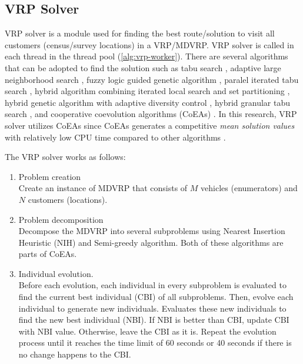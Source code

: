 \documentclass[conference]{IEEEtran}
\begin{document}
\subsection{VRP Solver}
\label{ssec:vrp-solver}
VRP solver is a module used for finding the best route/solution to visit all customers (census/survey locations) in a VRP/MDVRP. VRP solver is called in each thread in the thread pool (\autoref{alg:vrp-worker}). There are several algorithms that can be adopted to find the solution such as tabu search \cite{cordeau_tabu_1997}, adaptive large neighborhood search  \cite{pisinger_general_2007}, fuzzy logic guided genetic algorithm \cite{lau_application_2010}, paralel iterated tabu search \cite{cordeau_parallel_2012}, hybrid algorithm combining iterated local search and set partitioning \cite{subramanian_hybrid_2013}, hybrid genetic algorithm with adaptive diversity control \cite{vidal_implicit_2014}, hybrid granular tabu search \cite{escobar_hybrid_2014}, and cooperative coevolution algorithms (CoEAs) \cite{de_oliveira_cooperative_2016}. In this research, VRP solver utilizes CoEAs since CoEAs generates a competitive \textit{mean solution values} with relatively low CPU time compared to other algorithms \cite{de_oliveira_cooperative_2016}. 


The VRP solver works as follows:
\begin{enumerate}
	\item Problem creation \\
	Create an instance of MDVRP that consists of $M$ vehicles (enumerators) and $N$ customers (locations).
	\item Problem decomposition \\
	Decompose the MDVRP into several subproblems using Nearest Insertion Heuristic (NIH) and Semi-greedy algorithm. Both of these algorithms are parts of CoEAs. 
	\item Individual evolution. \\
	Before each evolution, each individual in every subproblem is evaluated to find the current best individual (CBI) of all subproblems. Then, evolve each individual to generate new individuals. Evaluates these new individuals to find the new best individual (NBI). If NBI is better than CBI, update CBI with NBI value. Otherwise, leave the CBI as it is. Repeat the evolution process until it reaches the time limit of 60 seconds or 40 seconds if there is no change happens to the CBI.    
\end{enumerate}
\end{document}
